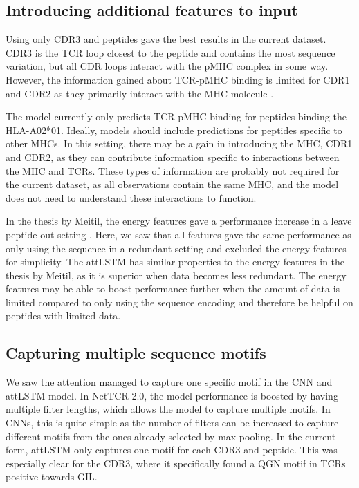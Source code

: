 \subsection{Introducing additional features to input}
Using only CDR3 and peptides gave the best results in the current dataset. CDR3 is the TCR loop closest to the peptide and contains the most sequence variation, but all CDR loops interact with the pMHC complex in some way. However, the information gained about TCR-pMHC binding is limited for CDR1 and CDR2 as they primarily interact with the MHC molecule \cite{Davis1988T-cellRecognition}.

The model currently only predicts TCR-pMHC binding for peptides binding the HLA-A02*01. Ideally, models should include predictions for peptides specific to other MHCs. In this setting, there may be a gain in introducing the MHC, CDR1 and CDR2, as they can contribute information specific to interactions between the MHC and TCRs. These types of information are probably not required for the current dataset, as all observations contain the same MHC, and the model does not need to understand these interactions to function.

In the thesis by Meitil, the energy features gave a performance increase in a leave peptide out setting \cite{Meitil2021UsingPrediction}. Here, we saw that all features gave the same performance as only using the sequence in a redundant setting and excluded the energy features for simplicity. The attLSTM has similar properties to the energy features in the thesis by Meitil, as it is superior when data becomes less redundant. The energy features may be able to boost performance further when the amount of data is limited compared to only using the sequence encoding and therefore be helpful on peptides with limited data. 


\subsection{Capturing multiple sequence motifs}
We saw the attention managed to capture one specific motif in the CNN and attLSTM model. In NetTCR-2.0, the model performance is boosted by having multiple filter lengths, which allows the model to capture multiple motifs. In CNNs, this is quite simple as the number of filters can be increased to capture different motifs from the ones already selected by max pooling. In the current form, attLSTM only captures one motif for each CDR3 and peptide. This was especially clear for the CDR3{\textalpha}, where it specifically found a QGN motif in TCRs positive towards GIL.

